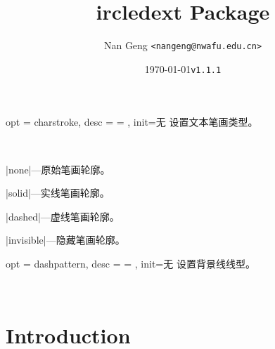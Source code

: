 \documentclass[full]{l3doc}
\def\vers{\texttt{v1.1.1} }
\begin{document}
\begin{documentation}
\bigskip

\begin{option}{ opt = charstroke, desc = {= }, init=无 }
  设置文本笔画类型。
\end{option}\\
\begin{Description}
  \item |none|---原始笔画轮廓。
  \item |solid|---实线笔画轮廓。
  \item |dashed|---虚线笔画轮廓。
  \item |invisible|---隐藏笔画轮廓。
\end{Description}
\begin{SideBySideExample}[frame=single,numbers=left,xrightmargin=.45\linewidth,gobble=2]
  \centering
  \quad
  \quad
  \quad
\end{SideBySideExample}

\bigskip

\begin{option}{ opt = dashpattern, desc = {= }, init=无 }
  设置背景线线型。
\end{option}\\
\begin{SideBySideExample}[frame=single,numbers=left,xrightmargin=.25\linewidth,gobble=2]
  \centering
  \quad
\end{SideBySideExample}

\title{
  ircledext Package 
}
\author{Nan Geng \texttt{<nangeng@nwafu.edu.cn>}}
\date{\today\qquad \vers}
\maketitle

\section{Introduction}


\end{documentation}
\end{document}
